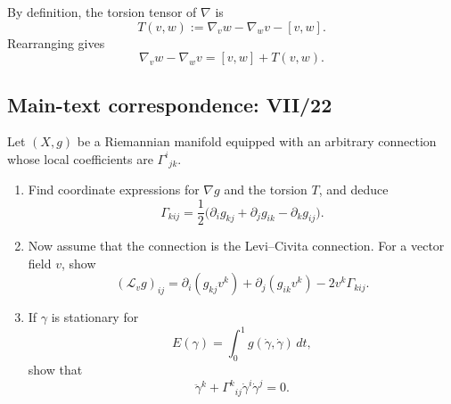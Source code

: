 \begin{solution}
By definition, the torsion tensor of $\nabla$ is
\[
T(v,w):=\nabla_v w-\nabla_w v-[v,w].
\]
Rearranging gives
\[
\nabla_v w-\nabla_w v=[v,w]+T(v,w).
\]
\end{solution}

\subsection*{Main-text correspondence: VII/22}

\begin{problem}
\label{prob:cp-vii-0062}
Let \((X,g)\) be a Riemannian manifold equipped with an arbitrary connection whose
local coefficients are \(\Gamma^i{}_{jk}\).

\begin{enumerate}[label=\textnormal{(\alph*)}]
\item Find coordinate expressions for \(\nabla g\) and the torsion \(T\), and deduce
\[
\Gamma_{kij}
=
\frac12\bigl(\partial_i g_{kj}+\partial_j g_{ik}-\partial_k g_{ij}\bigr).
\]

\item Now assume that the connection is the Levi--Civita connection. For a vector field
\(v\), show
\[
(\mathcal L_v g)_{ij}
=
\partial_i(g_{kj}v^k)+\partial_j(g_{ik}v^k)-2v^k\Gamma_{kij}.
\]

\item If \(\gamma\) is stationary for
\[
E(\gamma)=\int_0^1 g(\dot\gamma,\dot\gamma)\,dt,
\]
show that
\[
\ddot\gamma^k+\Gamma^k{}_{ij}\dot\gamma^i\dot\gamma^j=0.
\]
\end{enumerate}
\end{problem}

